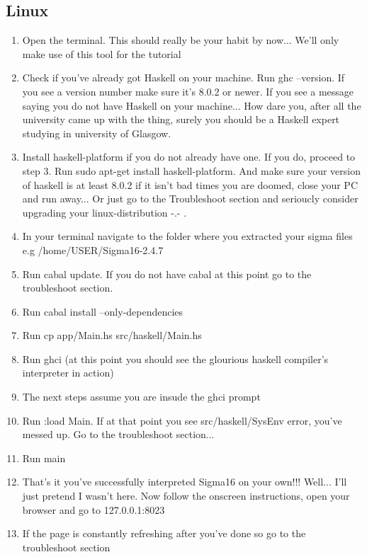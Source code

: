 \documentclass{article}
\begin{document}
 \subsection{Linux}
 \begin{enumerate}
      

   \item Open the terminal. This should really be your habit by now... We'll only make use of this tool for the tutorial
   \item Check if you've already got Haskell on your machine. Run ghc --version. If you see a version number make sure it's 8.0.2 or newer. If you see a message saying you do not have Haskell on your machine... How dare you, after all the university came up with the thing, surely you should be a Haskell expert studying in university of Glasgow.
   \item Install haskell-platform if you do not already have one. If you do, proceed to step 3. Run sudo apt-get install haskell-platform. And make sure your version of haskell is at least 8.0.2 if it isn't bad times you are doomed, close your PC and run away... Or just go to the Troubleshoot section and serioucly consider upgrading your linux-distribution -.- .
   \item In your terminal navigate to the folder where you extracted your sigma files e.g /home/USER/Sigma16-2.4.7
   \item Run cabal update. If you do not have cabal at this point go to the troubleshoot section.
   \item Run cabal install --only-dependencies
   \item Run cp app/Main.hs src/haskell/Main.hs
   \item Run ghci (at this point you should see the glourious haskell compiler's interpreter in action)
   \item The next steps assume you are insude the ghci prompt
   \item Run :load Main. If at that point you see src/haskell/SysEnv error, you've messed up. Go to the troubleshoot section...
   \item Run main
   \item That's it you've successfully interpreted Sigma16 on your own!!! Well... I'll just pretend I wasn't here. Now follow the onscreen instructions, open your browser and go to 127.0.0.1:8023
   \item If the page is constantly refreshing after you've done so go to the troubleshoot section

 \end{enumerate}
\end{document}
